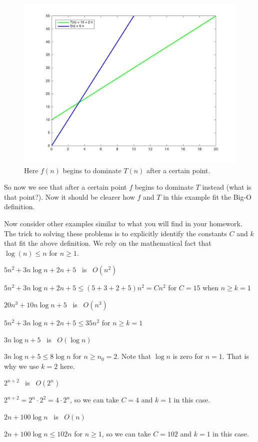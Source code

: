 \documentclass{tufte-handout}
\begin{document}
\begin{figure}
  \includegraphics{BigO2.png}
  \caption{Here $f(n)$ begins to dominate $T(n)$ after a certain point.}
  \label{fig:textfig}
\end{figure}


\bigskip
So now we see that after a certain point $f$ begins to dominate $T$ instead (what is that 
point?). Now it should be clearer how $f$ and $T$ in this example fit the Big-O definition.

\bigskip
Now consider other examples similar to what you will find in your homework. The trick to solving
these problems is to explicitly identify the constants $C$ and $k$ that fit the above definition. 
We rely on the mathematical fact that $\log(n) \leq n$ for $n \geq 1$.


$5 n^2 + 3 n \log n + 2 n + 5 $ \ is  \ $ O(n^2)$

  $5 n^2 + 3 n \log n + 2 n + 5 \leq (5 + 3 + 2 + 5) n^2  = C n^2 $ for 
$C = 15$ when $n \geq k = 1$


$20 n^3 + 10 n \log n + 5 $ \ is  \ $ O(n^3)$

  $5 n^2 + 3 n \log n + 2 n + 5 \leq 35 n^2$ for $n \geq k = 1$



$3n \log n + 5 $ \ is  \ $ O(\log n)$

  $3n \log n + 5  \leq 8 \log n$ for $n \geq n_0 = 2$. Note that 
$\log n$ is zero for $n = 1$. That is why we use $k = 2$ here.



$2^{n+2}$ \ is  \ $O(2^n)$

 $2^{n+2} = 2^n \cdot 2^2 = 4 \cdot 2^n$, so we can take $C = 4$ and $k = 1$ in this case. 



$2 n + 100 \log n$ \ is  \ $O(n)$

 $2 n + 100 \log n \leq 102 n$ for $n \geq 1$,  so we can take $C = 102$ and $k = 1$ in this case. 
\end{document}
